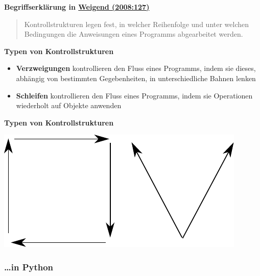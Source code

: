 \vspace{0.5cm}\par\noindent\textbf{Begriffserklärung in\vspace{0.5cm}
\href{http://bibliography.lingpy.org?key=Weigend2008}{Weigend
(2008:127)}}

\begin{quote}
Kontrollstrukturen legen fest, in welcher Reihenfolge und unter welchen
Bedingungen die Anweisungen eines Programms abgearbeitet werden.
\end{quote}



\vspace{0.5cm}\par\noindent\textbf{Typen von Kontrollstrukturen}\vspace{0.5cm}

\begin{itemize}
\itemsep1pt\parskip0pt
\item
  {\textbf{Verzweigungen} kontrollieren den Fluss eines Programms, indem
  sie dieses, abhängig von bestimmten Gegebenheiten, in unterschiedliche
  Bahnen lenken}
\item
  {\textbf{Schleifen} kontrollieren den Fluss eines Programms, indem sie
  Operationen wiederholt auf Objekte anwenden}
\end{itemize}



\vspace{0.5cm}\par\noindent\textbf{Typen von Kontrollstrukturen}\vspace{0.5cm}

\includegraphics[width=\textwidth]{img/kontrollstrukturen.pdf}


\subsubsection{\ldots in Python}

